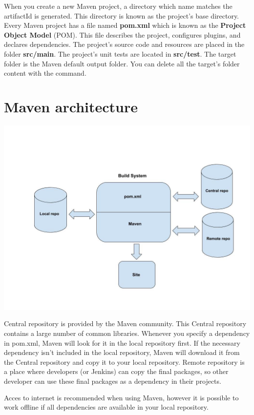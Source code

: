 When you create a new Maven project, a directory which name matches the artifactId is generated. This directory is known as the project’s base directory. 
Every Maven project has a file named \textbf{pom.xml} which is known as the \textbf{Project Object Model} (POM). This file describes the project, configures plugins, and declares dependencies.
The project’s source code and resources are placed in the folder \textbf{src/main}.
The project’s unit tests are located in \textbf{src/test}.
The target folder is the Maven default output folder. You can delete all the target's folder content with the  command.


\section{Maven architecture}

\includegraphics[width=\textwidth]{./images/maven/maven-architecture} 

Central repository is provided by the Maven community. This Central repository contains a large number of common libraries.  Whenever you specify a dependency in pom.xml,  Maven will look for it in the local repository first. If the necessary dependency  isn't included in the local repository, Maven will download it from the Central repository and copy it to your local repository.  Remote repository is a place where developers (or Jenkins) can copy the final packages, so other developer can use these final packages as a dependency in their projects.

Acces to internet is recommended when using Maven, however it is possible to work offline if all dependencies are available in your local repository.


